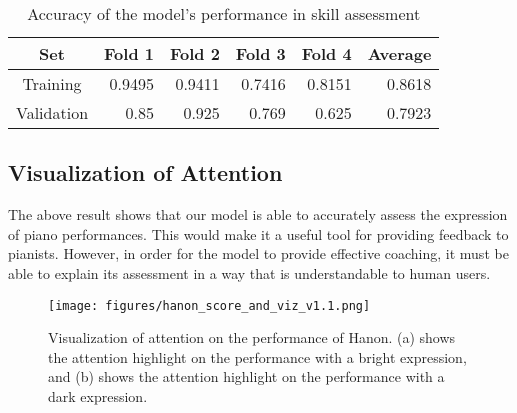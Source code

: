 \documentclass[manuscript,review,anonymous]{acmart}
\begin{document}
\begin{table*}[h!]
  \caption{Accuracy of the model's performance in skill assessment}
  \begin{tabular}{c|rrrr|r}
    \toprule
    Set & Fold 1 & Fold 2 & Fold 3 & Fold 4 & Average\\
    \midrule
    Training & 0.9495 & 0.9411 & 0.7416 & 0.8151 & 0.8618\\
    Validation & 0.85 & 0.925 & 0.769 & 0.625 & 0.7923
    \bottomrule
    \label{accuracy}
  \end{tabular}
\end{table*}


\subsection{Visualization of Attention}
The above result shows that our model is able to accurately assess the expression of piano performances.
This would make it a useful tool for providing feedback to pianists. 
However, in order for the model to provide effective coaching, it must be able to explain its assessment in a way that is understandable to human users.



\begin{figure}[h!]
  \centering
  \texttt{[image: figures/hanon\_score\_and\_viz\_v1.1.png]}
  \caption{Visualization of attention on the performance of Hanon. (a) shows the attention highlight on the performance with a bright expression, and (b) shows the attention highlight on the performance with a dark expression.}
  \Description{}
  \label{hanon_attn}
\end{figure}
\end{document}
